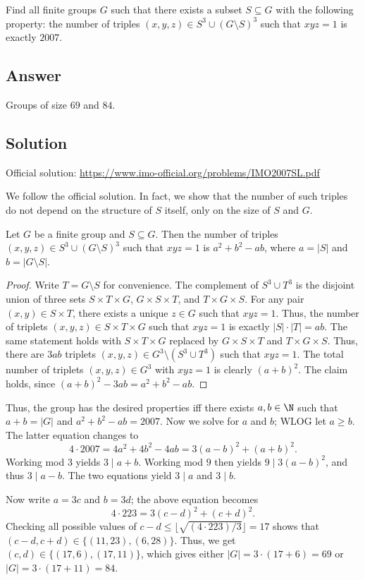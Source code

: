 Find all finite groups $G$ such that there exists a subset $S \subseteq G$ with the following property:
    the number of triples $(x, y, z) \in S^3 \cup (G \setminus S)^3$ such that $xyz = 1$ is exactly $2007$.



\subsection*{Answer}

Groups of size $69$ and $84$.



\subsection*{Solution}

Official solution: \url{https://www.imo-official.org/problems/IMO2007SL.pdf}

We follow the official solution.
In fact, we show that the number of such triples do not depend on the structure of $S$ itself, only on the size of $S$ and $G$.

\begin{claim}
Let $G$ be a finite group and $S \subseteq G$.
Then the number of triples $(x, y, z) \in S^3 \cup (G \setminus S)^3$ such that $xyz = 1$ is $a^2 + b^2 - ab$, where $a = |S|$ and $b = |G \setminus S|$.
\end{claim}
\begin{proof}
Write $T = G \setminus S$ for convenience.
The complement of $S^3 \cup T^3$ is the disjoint union of three sets $S \times T \times G$, $G \times S \times T$, and $T \times G \times S$.
For any pair $(x, y) \in S \times T$, there exists a unique $z \in G$ such that $xyz = 1$.
Thus, the number of triplets $(x, y, z) \in S \times T \times G$ such that $xyz = 1$ is exactly $|S| \cdot |T| = ab$.
The same statement holds with $S \times T \times G$ replaced by $G \times S \times T$ and $T \times G \times S$.
Thus, there are $3ab$ triplets $(x, y, z) \in G^3 \setminus (S^3 \cup T^3)$ such that $xyz = 1$.
The total number of triplets $(x, y, z) \in G^3$ with $xyz = 1$ is clearly $(a + b)^2$.
The claim holds, since $(a + b)^2 - 3ab = a^2 + b^2 - ab$.
\end{proof}

Thus, the group has the desired properties iff there exists $a, b \in \N$ such that $a + b = |G|$ and $a^2 + b^2 - ab = 2007$.
Now we solve for $a$ and $b$; WLOG let $a \geq b$.
The latter equation changes to
\[ 4 \cdot 2007 = 4a^2 + 4b^2 - 4ab = 3(a - b)^2 + (a + b)^2. \]
Working mod $3$ yields $3 \mid a + b$.
Working mod $9$ then yields $9 \mid 3(a - b)^2$, and thus $3 \mid a - b$.
The two equations yield $3 \mid a$ and $3 \mid b$.

Now write $a = 3c$ and $b = 3d$; the above equation becomes
\[ 4 \cdot 223 = 3(c - d)^2 + (c + d)^2. \]
Checking all possible values of $c - d \leq \lfloor \sqrt{(4 \cdot 223)/3} \rfloor = 17$ shows that $(c - d, c + d) \in \{(11, 23), (6, 28)\}$.
Thus, we get $(c, d) \in \{(17, 6), (17, 11)\}$, which gives either $|G| = 3 \cdot (17 + 6) = 69$ or $|G| = 3 \cdot (17 + 11) = 84$.
